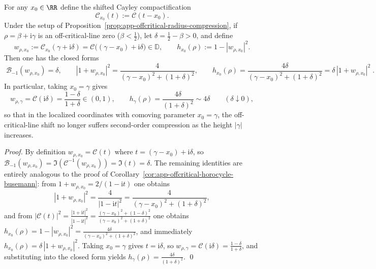 \begin{theorem}\label{thm:app-comoving-horizon-localization}
For any \(x_{0}\in\RR\) define the shifted Cayley compactification
\[
\mathcal{C}_{x_{0}}(t):=\mathcal{C}(t-x_{0}).
\]
Under the setup of Proposition~\ref{prop:app-offcritical-radius-compression}, if \(\rho=\beta+\mathrm{i}\gamma\) is an off-critical-line zero (\(\beta<\tfrac12\)), let \(\delta=\tfrac12-\beta>0\), and define
\[
w_{\rho,x_{0}}:=\mathcal{C}_{x_{0}}(\gamma+\mathrm{i}\delta)=\mathcal{C}\bigl((\gamma-x_{0})+\mathrm{i}\delta\bigr)\in\mathbb{D},
\qquad
h_{x_{0}}(\rho):=1-|w_{\rho,x_{0}}|^{2}.
\]
Then one has the closed forms
\[
\boxed{\;
\mathcal{B}_{-1}(w_{\rho,x_{0}})=\delta,\qquad
|1+w_{\rho,x_{0}}|^{2}=\frac{4}{(\gamma-x_{0})^{2}+(1+\delta)^{2}},\qquad
h_{x_{0}}(\rho)=\frac{4\delta}{(\gamma-x_{0})^{2}+(1+\delta)^{2}}
=\delta\,|1+w_{\rho,x_{0}}|^{2}\; }.
\]
In particular, taking \(x_{0}=\gamma\) gives
\[
w_{\rho,\gamma}=\mathcal{C}(\mathrm{i}\delta)=\frac{1-\delta}{1+\delta}\in(0,1),
\qquad
h_{\gamma}(\rho)=\frac{4\delta}{(1+\delta)^{2}}\sim 4\delta\qquad(\delta\downarrow 0),
\]
so that in the localized coordinates with comoving parameter \(x_{0}=\gamma\), the off-critical-line shift no longer suffers second-order compression as the height \(|\gamma|\) increases.
\end{theorem}

\begin{proof}
By definition \(w_{\rho,x_{0}}=\mathcal{C}(t)\) where \(t=(\gamma-x_{0})+\mathrm{i}\delta\), so
\(
\mathcal{B}_{-1}(w_{\rho,x_{0}})=\Im(\mathcal{C}^{-1}(w_{\rho,x_{0}}))=\Im(t)=\delta
\).
The remaining identities are entirely analogous to the proof of Corollary~\ref{cor:app-offcritical-horocycle-busemann}: from \(1+w_{\rho,x_{0}}=2/(1-\mathrm{i}t)\) one obtains
\[
|1+w_{\rho,x_{0}}|^{2}=\frac{4}{|1-\mathrm{i}t|^{2}}=\frac{4}{(\gamma-x_{0})^{2}+(1+\delta)^{2}},
\]
and from \(|\mathcal{C}(t)|^{2}=\frac{|1+\mathrm{i}t|^{2}}{|1-\mathrm{i}t|^{2}}=\frac{(\gamma-x_{0})^{2}+(1-\delta)^{2}}{(\gamma-x_{0})^{2}+(1+\delta)^{2}}\) one obtains
\(
h_{x_{0}}(\rho)=1-|w_{\rho,x_{0}}|^{2}=\frac{4\delta}{(\gamma-x_{0})^{2}+(1+\delta)^{2}}
\), and immediately \(h_{x_{0}}(\rho)=\delta\,|1+w_{\rho,x_{0}}|^{2}\).
Taking \(x_{0}=\gamma\) gives \(t=\mathrm{i}\delta\), so \(w_{\rho,\gamma}=\mathcal{C}(\mathrm{i}\delta)=\frac{1-\delta}{1+\delta}\), and substituting into the closed form yields \(h_{\gamma}(\rho)=\frac{4\delta}{(1+\delta)^{2}}\). \qed
\end{proof}

